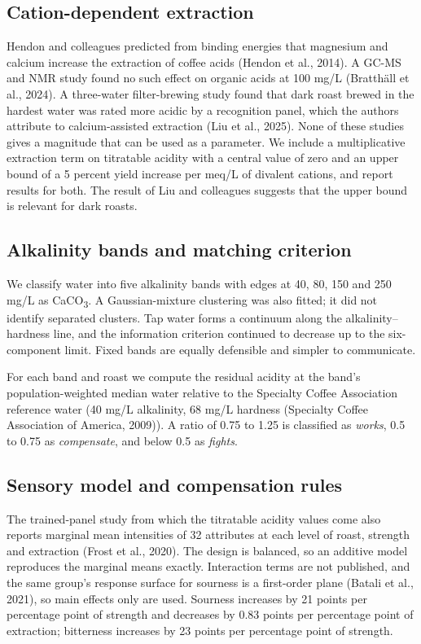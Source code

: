 \documentclass[
  a4paper,
]{article}
\begin{document}
\subsection{Cation-dependent
extraction}\label{cation-dependent-extraction}

Hendon and colleagues predicted from binding energies that magnesium and
calcium increase the extraction of coffee acids (Hendon et al., 2014). A
GC-MS and NMR study found no such effect on organic acids at 100 mg/L
(Bratthäll et al., 2024). A three-water filter-brewing study found that
dark roast brewed in the hardest water was rated more acidic by a
recognition panel, which the authors attribute to calcium-assisted
extraction (Liu et al., 2025). None of these studies gives a magnitude
that can be used as a parameter. We include a multiplicative extraction
term on titratable acidity with a central value of zero and an upper
bound of a 5 percent yield increase per meq/L of divalent cations, and
report results for both. The result of Liu and colleagues suggests that
the upper bound is relevant for dark roasts.

\subsection{Alkalinity bands and matching
criterion}\label{alkalinity-bands-and-matching-criterion}

We classify water into five alkalinity bands with edges at 40, 80, 150
and 250 mg/L as CaCO\textsubscript{3}. A Gaussian-mixture clustering was
also fitted; it did not identify separated clusters. Tap water forms a
continuum along the alkalinity--hardness line, and the information
criterion continued to decrease up to the six-component limit. Fixed
bands are equally defensible and simpler to communicate.

For each band and roast we compute the residual acidity at the band's
population-weighted median water relative to the Specialty Coffee
Association reference water (40 mg/L alkalinity, 68 mg/L hardness
(Specialty Coffee Association of America, 2009)). A ratio of 0.75 to
1.25 is classified as \emph{works}, 0.5 to 0.75 as \emph{compensate},
and below 0.5 as \emph{fights}.

\subsection{Sensory model and compensation
rules}\label{sensory-model-and-compensation-rules}

The trained-panel study from which the titratable acidity values come
also reports marginal mean intensities of 32 attributes at each level of
roast, strength and extraction (Frost et al., 2020). The design is
balanced, so an additive model reproduces the marginal means exactly.
Interaction terms are not published, and the same group's response
surface for sourness is a first-order plane (Batali et al., 2021), so
main effects only are used. Sourness increases by 21 points per
percentage point of strength and decreases by 0.83 points per percentage
point of extraction; bitterness increases by 23 points per percentage
point of strength.
\end{document}

